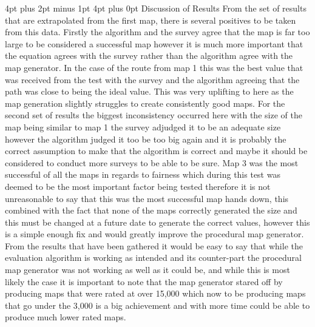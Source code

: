 \documentclass[12pt,a4paper,oneside]{book}
\makeatletter
\renewcommand\section{\@startsection {section}{1}{0mm} %
                               {4pt plus 2pt minus 1pt} %
                               {4pt plus 0pt} %
                               {\bfseries}}
\makeatother
\begin{document}
\section{Discussion of Results}
From the set of results that are extrapolated from the first map, there is several positives to be taken from this data. Firstly the algorithm and the survey agree that the map is far too large to be considered a successful map however it is much more important that the equation agrees with the survey rather than the algorithm agree with the map generator. In the case of the route from map 1 this was the best value that was received from the test with the survey and the algorithm agreeing that the path was close to being the ideal value. This was very uplifting to here as the map generation slightly struggles to create consistently good maps.
\vspace{5mm} 
\newline 
For the second set of results the biggest inconsistency occurred here with the size of the map being similar to map 1 the survey adjudged it to be an adequate size however the algorithm judged it too be too big again and it is probably the correct assumption to make that the algorithm is correct and maybe it should be considered to conduct more surveys to be able to be sure.
\vspace{5mm} 
\newline 
Map 3 was the most successful of all the maps in regards to fairness which during this test was deemed to be the most important factor being tested therefore it is not unreasonable to say that this was the most successful map hands down, this combined with the fact that none of the maps correctly generated the size and this must be changed at a future date to generate the correct values, however this is a simple enough fix and would greatly improve the procedural map generator. 
\vspace{5mm} 
\newline   
From the results that have been gathered it would be easy to say that while the evaluation algorithm is working as intended and its counter-part the procedural map generator was not working as well as it could be, and while this is most likely the case it is important to note that the map generator stared off by producing maps that were rated at over 15,000 which now to be producing maps that go under the 3,000 is a big achievement and with more time could be able to produce much lower rated maps. 
\vspace{5mm} 
\newline 
\end{document}
